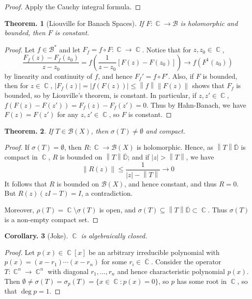 \documentclass[11pt, a4paper]{memoir}
\DeclareMathOperator{\C}{{\mathbb{C}}}
\newcommand{\norm}[1]{\ensuremath{\left\lVert#1\right\rVert}}
\theoremstyle{change}
\newtheorem{theorem}{Theorem.}[section]
\newtheorem{corollary}[theorem]{Corollary.}
\theoremstyle{plain}
\theoremstyle{nonumberplain}
\newtheorem{proof}{Proof}
\numberwithin{equation}{section}
\begin{document}
\begin{proof}
    Apply the Cauchy integral formula.
\end{proof}
\begin{theorem}[Liouville for Banach Spaces]
    If $F:\C\to\mathcal{B}$ is holomorphic and bounded, then $F$ is constant.
\end{theorem}
\begin{proof}
    Let $f\in\mathcal{B}^*$ and let $F_f=f\circ F:\C\to\C$.
    Notice that for $z,z_0\in\C$,
    \begin{equation*}
        \frac{F_f(z)-F_f(z_0)}{z-z_0}=f\left(\frac{1}{z-z_0}[F(z)-F(z_0)]\right)\to f(F^1(z_0))
    \end{equation*}
    by linearity and continuity of $f$, and hence $F_f'=f\circ F'$.
    Also, if $F$ is bounded, then for $z\in\C$, $|F_f(z)|=|f(F(z))|\leq\norm{f}\norm{F(z)}$ shows that $F_f$ is bounded, so by Liouville's theorem, is constant.
    In particular, if $z,z'\in\C$, $f(F(z)-F(z'))=F_f(z)-F_f(z')=0$.
    Thus by Hahn-Banach, we have $F(z)=F(z')$ for any $z,z'\in\C$, so $F$ is constant.
\end{proof}
\begin{theorem}
    If $T\in\mathcal{B}(X)$, then $\sigma(T)\neq\emptyset$ and compact.
\end{theorem}
\begin{proof}
    If $\sigma(T)=\emptyset$, then $R:\C\to\mathcal{B}(X)$ is holomorphic.
    Hence, as $\norm{T}\overline{\mathbb{D}}$ is compact in $\C$, $R$ is bounded on $\norm{T}\overline{\mathbb{D}}$; and if $|z|>\norm{T}$, we have
    \begin{equation*}
        \norm{R(z)}\leq\frac{1}{|z|-\norm{T}}\to 0
    \end{equation*}
    It follows that $R$ is bounded on $\mathcal{B}(X)$, and hence constant, and thus $R=0$.
    But $R(z)(zI-T)=I$, a contradiction.

    Moreover, $\rho(T)=\C\setminus\sigma(T)$ is open, and $\sigma(T)\subseteq\norm{T}\overline{\mathbb{D}}\subset\C$.
    Thus $\sigma(T)$ is a non-empty compact set.
\end{proof}
\begin{corollary}[Joke]
    $\C$ is algebraically closed.
\end{corollary}
\begin{proof}
    Let $p(x)\in\C[x]$ be an arbitrary irreducible polynomial with $p(x)=(x-r_1)\cdots(x-r_n)$ for some $r_i\in\overline{\C}$.
    Consider the operator $T:\C^n\to\C^n$ with diagonal $r_1,\ldots,r_n$ and hence characteristic polynomial $p(x)$.
    Then $\emptyset\neq\sigma(T)=\sigma_p(T)=\{x\in\C:p(x)=0\}$, so $p$ has some root in $\C$, so that $\deg p=1$.
\end{proof}
\end{document}
